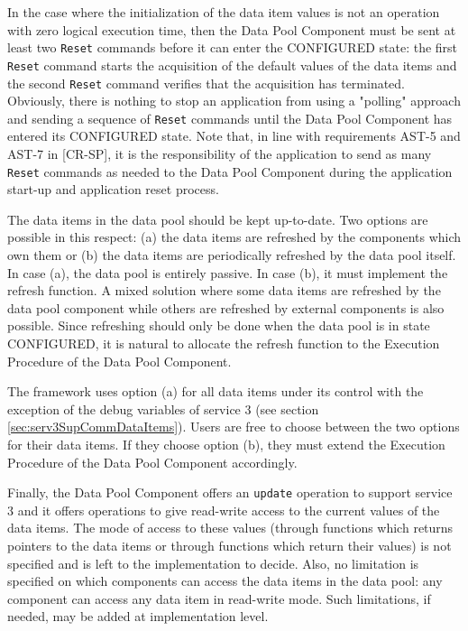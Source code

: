 \documentclass{pnp_article}
\begin{document}
In the case where the initialization of the data item values is not an operation with zero logical execution time, then the Data Pool Component must be sent at least two \texttt{Reset} commands before it can enter the CONFIGURED state: the first \texttt{Reset} command starts the acquisition of the default values of the data items and the second \texttt{Reset} command verifies that the acquisition has terminated. Obviously, there is nothing to stop an application from using a "polling" approach and sending a sequence of \texttt{Reset} commands until the Data Pool Component has entered its CONFIGURED state. Note that, in line with requirements AST-5 and AST-7 in [CR-SP], it is the responsibility of the application to send as many \texttt{Reset} commands as needed to the Data Pool Component during the application start-up and application reset process.

The data items in the data pool should be kept up-to-date. Two options are possible in this respect: (a) the data items are refreshed by the components which own them or (b) the data items are periodically refreshed by the data pool itself. In case (a), the data pool is entirely passive. In case (b), it must implement the refresh function. A mixed solution where some data items are refreshed by the data pool component while others are refreshed by external components is also possible. Since refreshing should only be done when the data pool is in state CONFIGURED, it is natural to allocate the refresh function to the Execution Procedure of the Data Pool Component. 

The framework uses option (a) for all data items under its control with the exception of the debug variables of service 3 (see section \ref{sec:serv3SupCommDataItems}). Users are free to choose between the two options for their data items. If they choose option (b), they must extend the Execution Procedure of the Data Pool Component accordingly.

Finally, the Data Pool Component offers an \texttt{update} operation to support service 3 and it offers operations to give read-write access to the current values of the data items. The mode of access to these values (through functions which returns pointers to the data items or through functions which return their values) is not specified and is left to the implementation to decide. Also, no limitation is specified on which components can access the data items in the data pool: any component can access any data item in read-write mode. Such limitations, if needed, may be added at implementation level. 
\end{document}
